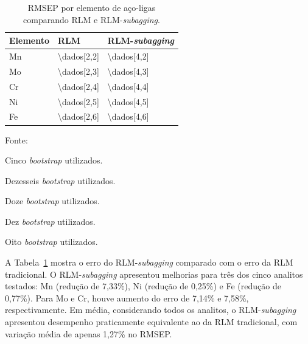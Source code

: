\begin{table}[!htbp]
\centering
\small
\begin{threeparttable}
\caption{RMSEP por elemento de aço-ligas comparando RLM e RLM-\textit{subagging}.}
\label{tab:subagging}
\begin{tabular}{p{4cm} p{3cm} p{3cm}} %
\toprule
\textbf{Elemento} & \textbf{RLM} & \textbf{RLM-\textit{subagging}} \\ 
\midrule
Mn & \num{\dados[2,2]} & \num{\dados[4,2]} \tnote{a} \\ 
Mo & \num{\dados[2,3]} & \num{\dados[4,3]} \tnote{b} \\ 
Cr & \num{\dados[2,4]} & \num{\dados[4,4]} \tnote{c} \\ 
Ni & \num{\dados[2,5]} & \num{\dados[4,5]} \tnote{d} \\ 
Fe & \num{\dados[2,6]} & \num{\dados[4,6]} \tnote{e} \\ 
\bottomrule
\end{tabular}
\begin{tablenotes}[flushleft]
    \footnotesize
    \item \footnotesize{Fonte:~\oautor}
    \item[a] Cinco \textit{bootstrap} utilizados.
		\item[b] Dezesseis \textit{bootstrap} utilizados. 
		\item[c] Doze \textit{bootstrap} utilizados. 
		\item[d] Dez \textit{bootstrap} utilizados. 
		\item[e] Oito \textit{bootstrap} utilizados.
\end{tablenotes}
\end{threeparttable}
\end{table}


A Tabela~\ref{tab:subagging} mostra o erro do RLM-\textit{subagging} comparado com o erro da RLM tradicional. O RLM-\textit{subagging} apresentou melhorias para três dos cinco analitos testados: Mn (redução de 7,33\%), Ni (redução de 0,25\%) e Fe (redução de 0,77\%). Para Mo e Cr, houve aumento do erro de 7,14\% e 7,58\%, respectivamente. Em média, considerando todos os analitos, o RLM-\textit{subagging} apresentou desempenho praticamente equivalente ao da RLM tradicional, com variação média de apenas 1,27\% no RMSEP.



